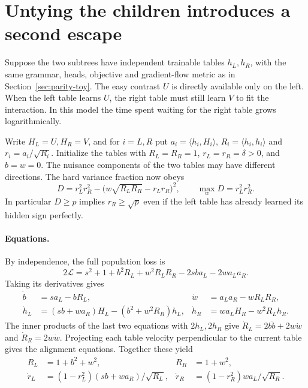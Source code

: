 \section{Untying the children introduces a second escape}
\label{sec:untied}

Suppose the two subtrees have independent trainable tables $h_L,h_R$, with the
same grammar, heads, objective and gradient-flow metric as in
Section~\ref{sec:parity-toy}. The easy contrast $U$ is directly available
only on the left. When the left table learns $U$, the right table must
still learn $V$ to fit the interaction. In this model the time spent
waiting for the right table grows logarithmically.

Write $H_L=U,H_R=V$, and for $i=L,R$ put
$a_i=\langle h_i,H_i\rangle$, $R_i=\langle h_i,h_i\rangle$ and
$r_i=a_i/\sqrt{R_i}$. Initialize the tables with $R_L=R_R=1$,
$r_L=r_R=\delta>0$, and $b=w=0$. The nuisance components of the two
tables may have different directions. The hard variance fraction now obeys
\[
 D=r_L^2r_R^2-\big(w\sqrt{R_LR_R}-r_Lr_R\big)^2,
 \qquad \max_w D=r_L^2r_R^2 .
\]
In particular $D\ge p$ implies $r_R\ge\sqrt p$ even if the left table has
already learned its hidden sign perfectly.

\paragraph{Equations.}
By independence, the full population loss is
\[
 2\mathcal L=s^2+1+b^2R_L+w^2R_LR_R-2sba_L-2wa_La_R.
\]
Taking its derivatives gives
\begin{align*}
 \dot b&=sa_L-bR_L,& \dot w&=a_La_R-wR_LR_R,\\
 \dot h_L&=(sb+wa_R)H_L-(b^2+w^2R_R)h_L,&
 \dot h_R&=wa_L H_R-w^2R_Lh_R .
\end{align*}
The inner products of the last two equations with $2h_L,2h_R$ give
$\dot R_L=2b\dot b+2w\dot w$ and $\dot R_R=2w\dot w$.
Projecting each table velocity perpendicular to the current table gives
the alignment equations. Together these yield
\begin{align}
 R_L&=1+b^2+w^2, & R_R&=1+w^2,\nonumber\\
 \dot r_L&=(1-r_L^2)(sb+wa_R)/\sqrt{R_L},&
 \dot r_R&=(1-r_R^2)w a_L/\sqrt{R_R}.
 \label{eq:untied-flow}
\end{align}

